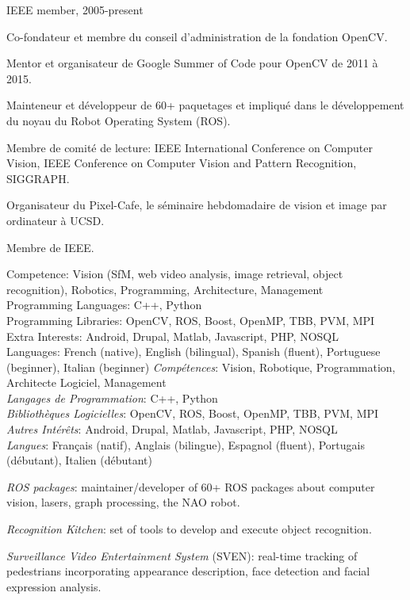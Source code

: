 \documentclass{article}
\begin{document}
\begin{llist}
{IEEE member, 2005-present
}
{

Co-fondateur et membre du conseil d'administration de la fondation OpenCV.

Mentor et organisateur de Google Summer of Code pour OpenCV de 2011 \`{a} 2015.

Mainteneur et d\'{e}veloppeur de 60+ paquetages et impliqu\'{e} dans le d\'{e}veloppement du
noyau du Robot Operating System (ROS).

Membre de comit\'{e} de lecture: IEEE International Conference on Computer Vision, IEEE Conference on Computer Vision 
and Pattern Recognition, SIGGRAPH.

Organisateur du Pixel-Cafe, le s\'{e}minaire hebdomadaire de vision et image par ordinateur \`{a} UCSD.

Membre de IEEE.
}

{
Competence: Vision (SfM, web video analysis, image retrieval, object recognition), Robotics, Programming, Architecture, 
Management \\
Programming Languages: C++, Python\\
Programming Libraries: OpenCV, ROS, Boost, OpenMP, TBB, PVM, MPI \\
Extra Interests: Android, Drupal, Matlab, Javascript, PHP, NOSQL \\
Languages: French (native), English (bilingual), Spanish (fluent), Portuguese (beginner), Italian (beginner)
}
{
{\em Comp\'{e}tences}: Vision, Robotique, Programmation, Architecte Logiciel, Management\\
{\em Langages de Programmation}: C++, Python\\
{\em Biblioth\`{e}ques Logicielles}: OpenCV, ROS, Boost, OpenMP, TBB, PVM, MPI \\
{\em Autres Int\'{e}r\^{e}ts}: Android, Drupal, Matlab, Javascript, PHP, NOSQL \\
{\em Langues}: Fran\c{c}ais (natif), Anglais (bilingue), Espagnol (fluent), Portugais (d\'{e}butant), Italien
(d\'{e}butant)
}

{
{\em ROS packages}: maintainer/developer of 60+ ROS packages about computer vision, lasers, graph processing, the NAO 
robot.

{\em Recognition Kitchen}: set of tools to develop and execute object recognition.

{\em Surveillance Video Entertainment System} (SVEN): real-time tracking of pedestrians incorporating appearance 
description, face detection and facial expression analysis.

}
\end{llist}
\end{document}
